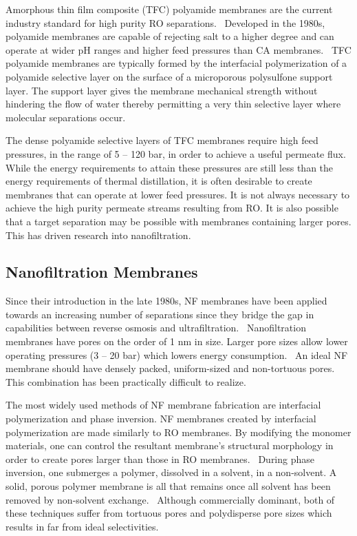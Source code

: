   Amorphous thin film composite (TFC) polyamide membranes are the current industry 
  standard for high purity RO separations.~\cite{baker_membrane_2012} Developed 
  in the 1980s, polyamide membranes are capable of rejecting salt to a higher 
  degree and can operate at wider pH ranges and higher feed pressures than 
  CA membranes.~\cite{cadotte_interfacial_1981} TFC polyamide membranes are 
  typically formed by the interfacial polymerization of a polyamide selective 
  layer on the surface of a microporous polysulfone support layer. The support
  layer gives the membrane mechanical strength without hindering the flow of 
  water thereby permitting a very thin selective layer where molecular 
  separations occur.~\cite{kucera_biofouling_2019}
  
  The dense polyamide selective layers of TFC membranes require high feed pressures,
  in the range of 5 -- 120 bar, in order to achieve a useful permeate flux.~\cite{van_der_bruggen_review_2003}
  While the energy requirements to attain these pressures are still less than 
  the energy requirements of thermal distillation\cite{morton_environmental_1997}, it 
  is often desirable to create membranes that can operate at lower feed pressures.
  It is not always necessary to achieve the high purity permeate streams
  resulting from RO. It is also possible that a target separation may be possible with 
  membranes containing larger pores. This has driven research into nanofiltration.
  
  \subsection{Nanofiltration Membranes}

  Since their introduction in the late 1980s, NF membranes have been applied towards
  an increasing number of separations since they bridge the gap in capabilities
  between reverse osmosis and ultrafiltration.~\cite{eriksson_nanofiltration_1988}
  Nanofiltration membranes have pores on the order of 1 nm in size. Larger pore sizes
  allow lower operating pressures (3 -- 20 bar) which lowers energy consumption.~\cite{van_der_bruggen_review_2003}
  An ideal NF membrane should have densely packed, uniform-sized and non-tortuous 
  pores.~\cite{jackson_nanoporous_2010} This combination has been practically difficult to realize.
  
  The most widely used methods of NF membrane fabrication are interfacial polymerization
  and phase inversion. NF membranes created by interfacial polymerization are made similarly
  to RO membranes. By modifying the monomer materials, one can control the resultant
  membrane's structural morphology in order to create pores larger than those in RO 
  membranes.~\cite{seman_nanofiltration_2010} During phase inversion, one submerges a 
  polymer, dissolved in a solvent, in a non-solvent. A solid, porous polymer membrane 
  is all that remains once all solvent has been removed by non-solvent exchange.~\cite{smolders_microstructures_1992}
  Although commercially dominant, both of these techniques suffer from tortuous pores
  and polydisperse pore sizes which results in far from ideal selectivities.
    
